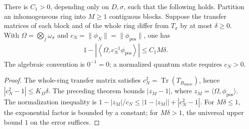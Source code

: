 \begin{lemma}
    \label{thm:ldp_inhomogeneous_normalized_pairs}
    \leanok
    There is $C_1>0$, depending only on $D,\sigma$, such that the following
    holds. Partition an inhomogeneous ring into $M\ge1$ contiguous
    blocks. Suppose the transfer matrices of each block and of the whole
    ring differ from $T_\sigma$ by at most $\delta\ge0$. With
    $\Omega=\bigotimes_j\omega_\sigma$ and
    $c_N=\|\phi_N\|=\|\phi_{\mathrm{pos}}\|$, one has
    \begin{align}
        1-\left|\left\langle\Omega,
        c_N^{-1}\phi_{\mathrm{pos}}\right\rangle\right|
        \le C_1M\delta.
    \end{align}
    The algebraic convention is $0^{-1}=0$; a normalized quantum state
    requires $c_N>0$.
\end{lemma}
\begin{proof}\leanok
    The whole-ring transfer matrix satisfies
    $c_N^2=\operatorname{Tr}(T_{B_{\mathrm{whole}}})$, hence
    $|c_N^2-1|\le K_D\delta$. The preceding theorem bounds
    $|z_M-1|$, where $z_M=\langle\Omega,\phi_{\mathrm{pos}}\rangle$.
    The normalization inequality is
    $1-|z_M|/c_N\le|1-|z_M||+|c_N^2-1|$.
    For $M\delta\le1$, the exponential factor is bounded by a constant;
    for $M\delta>1$, the universal upper bound $1$ on the error suffices.
\end{proof}

